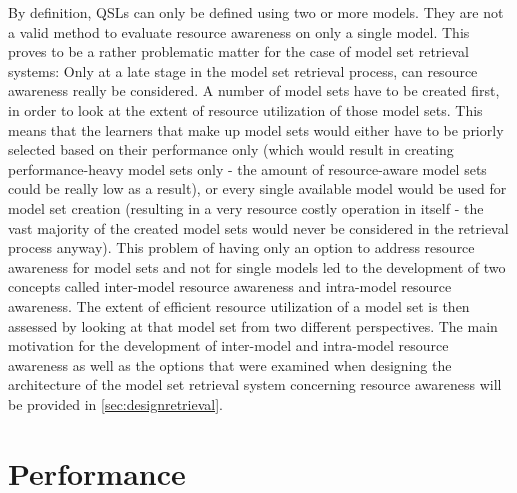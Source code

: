 By definition, QSLs can only be defined using two or more models. They are not a valid method to evaluate resource awareness on only a single model. This proves to be a rather problematic matter for the case of model set retrieval systems: Only at a late stage in the model set retrieval process, can resource awareness really be considered. A number of model sets have to be created first, in order to look at the extent of resource utilization of those model sets. This means that the learners that make up model sets would either have to be priorly selected based on their performance only (which would result in creating performance-heavy model sets only - the amount of resource-aware model sets could be really low as a result), or every single available model would be used for model set creation (resulting in a very resource costly operation in itself - the vast majority of the created model sets would never be considered in the retrieval process anyway). This problem of having only an option to address resource awareness for model sets and not for single models led to the development of two concepts called inter-model resource awareness and intra-model resource awareness. The extent of efficient resource utilization of a model set is then assessed by looking at that model set from two different perspectives. The main motivation for the development of inter-model and intra-model resource awareness as well as the options that were examined when designing the architecture of the model set retrieval system concerning resource awareness will be provided in \autoref{sec:designretrieval}.


\section{Performance} \label{performance}

